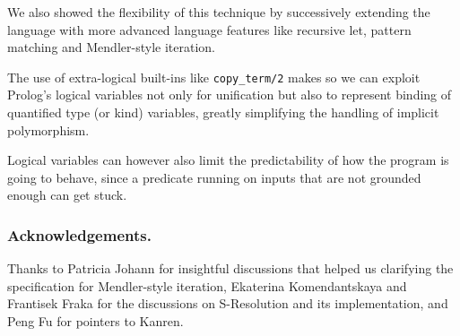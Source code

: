 \documentclass[runningheads,a4paper]{llncs}
\begin{document}
We also showed the flexibility of this technique by successively
extending the language with more advanced language features like
recursive let, pattern matching and Mendler-style iteration.

The use of extra-logical built-ins like \verb|copy_term/2| makes so we
can exploit Prolog's logical variables not only for unification but
also to represent binding of quantified type (or kind) variables,
greatly simplifying the handling of implicit polymorphism.

Logical variables can however also limit the predictability of how the
program is going to behave, since a predicate running on inputs that
are not grounded enough can get stuck.

\subsubsection*{Acknowledgements.}
Thanks to Patricia Johann for insightful discussions that helped us clarifying
the specification for Mendler-style iteration, Ekaterina Komendantskaya and
Frantisek Fraka for the discussions on S-Resolution and its implementation,
and Peng Fu for pointers to Kanren.
\makeatletter
\renewcommand\bibsection{\section*\bibname}
\makeatother



\end{document}
